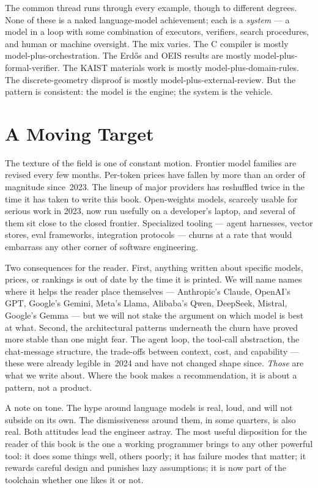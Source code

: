 The common thread runs through every example, though to different
degrees. None of these is a naked language-model achievement;
each is a \emph{system} --- a model in a loop with some
combination of executors, verifiers, search procedures, and human
or machine oversight. The mix varies. The C compiler is mostly
model-plus-orchestration. The Erd\H{o}s and OEIS results are
mostly model-plus-formal-verifier. The KAIST materials work is
mostly model-plus-domain-rules. The discrete-geometry disproof is
mostly model-plus-external-review. But the pattern is consistent:
the model is the engine; the system is the vehicle.

\section{A Moving Target}
\label{sec:intro-target}

The texture of the field is one of constant motion. Frontier model
families are revised every few months. Per-token prices have fallen
by more than an order of magnitude since~2023. The lineup of major
providers has reshuffled twice in the time it has taken to write
this book. Open-weights models, scarcely usable for serious work in
2023, now run usefully on a developer's laptop, and several of them
sit close to the closed frontier. Specialized tooling --- agent
harnesses, vector stores, eval frameworks, integration protocols ---
churns at a rate that would embarrass any other corner of software
engineering.

Two consequences for the reader. First, anything written about
specific models, prices, or rankings is out of date by the time it
is printed. We will name names where it helps the reader place
themselves --- Anthropic's Claude, OpenAI's GPT, Google's Gemini,
Meta's Llama, Alibaba's Qwen, DeepSeek, Mistral, Google's Gemma ---
but we will not stake the argument on which model is best at what.
Second, the architectural patterns underneath the churn have proved
more stable than one might fear. The agent loop, the tool-call
abstraction, the chat-message structure, the trade-offs between
context, cost, and capability --- these were already legible
in~2024 and have not changed shape since. \emph{Those} are what we
write about. Where the book makes a recommendation, it is about a
pattern, not a product.

A note on tone. The hype around language models is real, loud, and
will not subside on its own. The dismissiveness around them, in
some quarters, is also real. Both attitudes lead the engineer
astray. The most useful disposition for the reader of this book is
the one a working programmer brings to any other powerful tool: it
does some things well, others poorly; it has failure modes that
matter; it rewards careful design and punishes lazy assumptions; it
is now part of the toolchain whether one likes it or not.

